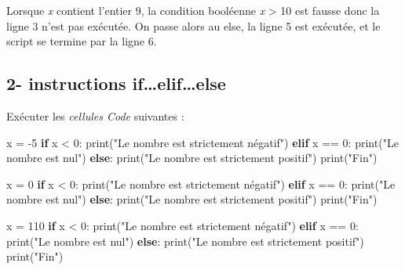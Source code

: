 \documentclass[
  paper=a4,
  ,captions=tableheading
]{scrartcl}
\newenvironment{Shaded}{}{}
\newcommand{\BuiltInTok}[1]{\textcolor[rgb]{0.00,0.50,0.00}{#1}}
\newcommand{\ControlFlowTok}[1]{\textcolor[rgb]{0.00,0.44,0.13}{\textbf{#1}}}
\newcommand{\DecValTok}[1]{\textcolor[rgb]{0.25,0.63,0.44}{#1}}
\newcommand{\NormalTok}[1]{#1}
\newcommand{\OperatorTok}[1]{\textcolor[rgb]{0.40,0.40,0.40}{#1}}
\newcommand{\StringTok}[1]{\textcolor[rgb]{0.25,0.44,0.63}{#1}}
\begin{document}
Lorsque \emph{x} contient l'entier 9, la condition booléenne
\emph{x} \textgreater{} 10 est fausse donc la ligne 3 n'est pas
exécutée. On passe alors au else, la ligne 5 est exécutée, et le script
se termine par la ligne 6.

\hypertarget{2--instructions-ifelifelse}{%
\subsection{2- instructions
if\ldots elif\ldots else}\label{2--instructions-ifelifelse}}

Exécuter les \emph{cellules Code} suivantes :

\begin{Shaded}
\begin{Highlighting}[]
\NormalTok{x }\OperatorTok{=} \OperatorTok{{-}}\DecValTok{5}
\ControlFlowTok{if}\NormalTok{ x }\OperatorTok{\textless{}} \DecValTok{0}\NormalTok{:}
    \BuiltInTok{print}\NormalTok{(}\StringTok{"Le nombre est strictement négatif"}\NormalTok{)}
\ControlFlowTok{elif}\NormalTok{ x }\OperatorTok{==} \DecValTok{0}\NormalTok{:}
    \BuiltInTok{print}\NormalTok{(}\StringTok{"Le nombre est nul"}\NormalTok{)}
\ControlFlowTok{else}\NormalTok{:}
    \BuiltInTok{print}\NormalTok{(}\StringTok{"Le nombre est strictement positif"}\NormalTok{)}
\BuiltInTok{print}\NormalTok{(}\StringTok{"Fin"}\NormalTok{)}
\end{Highlighting}
\end{Shaded}

\begin{Shaded}
\begin{Highlighting}[]
\NormalTok{x }\OperatorTok{=} \DecValTok{0}
\ControlFlowTok{if}\NormalTok{ x }\OperatorTok{\textless{}} \DecValTok{0}\NormalTok{:}
    \BuiltInTok{print}\NormalTok{(}\StringTok{"Le nombre est strictement négatif"}\NormalTok{)}
\ControlFlowTok{elif}\NormalTok{ x }\OperatorTok{==} \DecValTok{0}\NormalTok{:}
    \BuiltInTok{print}\NormalTok{(}\StringTok{"Le nombre est nul"}\NormalTok{)}
\ControlFlowTok{else}\NormalTok{:}
    \BuiltInTok{print}\NormalTok{(}\StringTok{"Le nombre est strictement positif"}\NormalTok{)}
\BuiltInTok{print}\NormalTok{(}\StringTok{"Fin"}\NormalTok{)}
\end{Highlighting}
\end{Shaded}

\begin{Shaded}
\begin{Highlighting}[]
\NormalTok{x }\OperatorTok{=} \DecValTok{110}
\ControlFlowTok{if}\NormalTok{ x }\OperatorTok{\textless{}} \DecValTok{0}\NormalTok{:}
    \BuiltInTok{print}\NormalTok{(}\StringTok{"Le nombre est strictement négatif"}\NormalTok{)}
\ControlFlowTok{elif}\NormalTok{ x }\OperatorTok{==} \DecValTok{0}\NormalTok{:}
    \BuiltInTok{print}\NormalTok{(}\StringTok{"Le nombre est nul"}\NormalTok{)}
\ControlFlowTok{else}\NormalTok{:}
    \BuiltInTok{print}\NormalTok{(}\StringTok{"Le nombre est strictement positif"}\NormalTok{)}
\BuiltInTok{print}\NormalTok{(}\StringTok{"Fin"}\NormalTok{)}
\end{Highlighting}
\end{Shaded}
\end{document}

